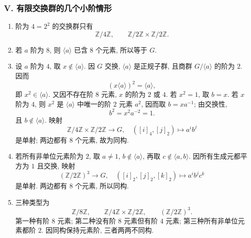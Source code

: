 \documentclass[usesamecnt, thmcnt=section, lang=cn, newtx, 10pt, scheme=chinese]{elegantbook}
\begin{document}
\subsubsection*{V. 有限交换群的几个小阶情形}
\begin{enumerate}[label=\textbf{\arabic*.}, start=20]
  \item 阶为 $4=2^2$ 的交换群只有
  \[
   \mathbb Z/4\mathbb Z,
   \qquad
   \mathbb Z/2\mathbb Z\times\mathbb Z/2\mathbb Z.
  \]
  \item 若 $a$ 阶为 $8$, 则 $\langle a\rangle$ 已含 $8$ 个元素, 所以等于 $G$.
  \item 设 $a$ 阶为 $4$, 取 $x\notin\langle a\rangle$. 因 $G$ 交换, $\langle a\rangle$ 是正规子群, 且商群 $G/\langle a\rangle$ 的阶为 $2$. 因而
  \[
   (x\langle a\rangle)^2=\langle a\rangle,
  \]
  即 $x^2\in\langle a\rangle$. 又因不存在阶 $8$ 元素, $x$ 的阶为 $2$ 或 $4$. 若 $x^2=1$, 取 $b=x$. 若 $x$ 阶为 $4$, 则 $x^2$ 是 $\langle a\rangle$ 中唯一的阶 $2$ 元素 $a^2$, 因而取 $b=xa^{-1}$; 由交换性,
  \[
   b^2=x^2a^{-2}=1.
  \]
  且 $b\notin\langle a\rangle$. 映射
  \[
   \mathbb Z/4\mathbb Z\times\mathbb Z/2\mathbb Z\to G,
   \quad([i]_4,[j]_2)\mapsto a^ib^j
  \]
  是单射; 两边都有 $8$ 个元素, 故为同构.
  \item 若所有非单位元素阶为 $2$, 取 $a\neq1$, $b\notin\langle a\rangle$, 再取 $c\notin\langle a,b\rangle$. 因所有生成元都平方为 $1$ 且交换, 映射
  \[
   (\mathbb Z/2\mathbb Z)^3\to G,
   \quad([i]_2,[j]_2,[k]_2)\mapsto a^ib^jc^k
  \]
  是单射. 两边都有 $8$ 个元素, 所以同构.
  \item 三种类型为
  \[
   \mathbb Z/8\mathbb Z,
   \qquad
   \mathbb Z/4\mathbb Z\times\mathbb Z/2\mathbb Z,
   \qquad
   (\mathbb Z/2\mathbb Z)^3.
  \]
  第一种有阶 $8$ 元素; 第二种没有阶 $8$ 元素但有阶 $4$ 元素; 第三种所有非单位元素都阶 $2$. 因同构保持元素阶, 三者两两不同构.
\end{enumerate}
\end{document}
